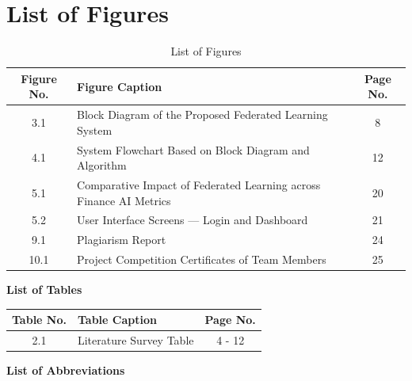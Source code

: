 \documentclass[12pt,a4paper]{report}
\newcommand{\sectionleft}[1]{%
    \vspace*{1cm}%
    {\raggedright\bfseries\fontsize{24}{28}\selectfont #1\par}
    \vspace{1cm}
}
\begin{document}
\section*{List of Figures}
\thispagestyle{plain}

\vspace{0.5cm}

\begin{table}[h!]
\centering
\begin{tabular}{|c|p{}|c|}
\hline
\textbf{Figure No.} & \centering\textbf{Figure Caption} & \textbf{Page No.} \\
\hline
3.1 & Block Diagram of the Proposed Federated Learning System & 8 \\
\hline
4.1 & System Flowchart Based on Block Diagram and Algorithm & 12 \\
\hline
5.1 & Comparative Impact of Federated Learning across Finance AI Metrics & 20 \\
\hline
5.2 & User Interface Screens — Login and Dashboard & 21 \\
\hline
9.1 & Plagiarism Report & 24 \\
\hline
10.1 & Project Competition Certificates of Team \space \space \space Members & 25 \\
\hline
\end{tabular}
\caption{List of Figures}
\end{table}

\newpage

\sectionleft{List of Tables}
\thispagestyle{plain}

\vspace{0.5cm}
\begin{center}
\begin{tabular}{|c|p{10cm}|c|}
\hline
\textbf{Table No.} & \textbf{Table Caption} & \textbf{Page No.} \\
\hline
2.1 & Literature Survey Table & 4 - 12 \\
\hline
\end{tabular}
\end{center}

\newpage

\sectionleft{List of Abbreviations}
\thispagestyle{plain}
\end{document}
